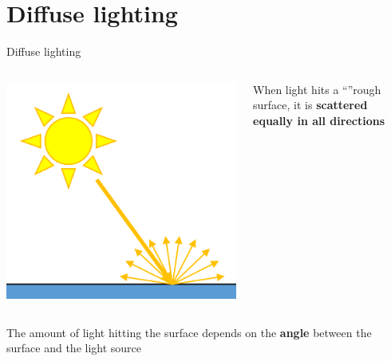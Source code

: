\part{Diffuse lighting}
\frame{\partpage}

\begin{frame}{Diffuse lighting}
	\pause
	\begin{columns}
		\begin{column}{0.33\textwidth}
			\includegraphics[width=\textwidth]{diffuse_1}
		\end{column}
		\begin{column}{0.65\textwidth}
			When light hits a ``''rough surface, it is \textbf{scattered equally in all directions}
		\end{column}
	\end{columns}
	\pause
	\begin{columns}
		\begin{column}{0.65\textwidth}
			The amount of light hitting the surface depends on the \textbf{angle} between the surface and the light source
		\end{column}
		\begin{column}{0.33\textwidth}

\end{column}
\end{columns}
\end{frame}
